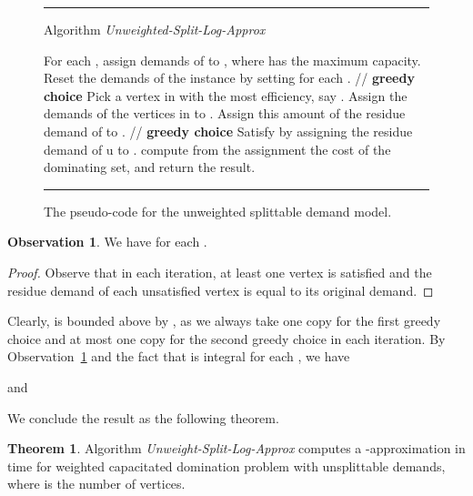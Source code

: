 \documentclass[a4paper,11pt]{article}
\theoremstyle{definition}
\newtheorem{observation}{Observation}
\newtheorem{theorem}{Theorem}
\begin{document}
\begin{figure*}[t]
\rule{\linewidth}{0.2mm}
\medskip
{{\sc Algorithm} {\em Unweighted-Split-Log-Approx}}

\begin{algorithmic}[1]
\STATE For each , assign  demands of  to , where  has the maximum capacity.
\STATE Reset the demands of the instance by setting  for each .
    \STATE // {\bf  greedy choice}
    \STATE Pick a vertex in  with the most efficiency, say .
        \STATE Assign the demands of the vertices in  to .
        \IF{}
            \STATE Assign this amount  of the residue demand of  to .
        \ENDIF
    \STATE
    \STATE // {\bf  greedy choice}
        \STATE Satisfy  by assigning the residue demand of u to .
    \ENDIF
\ENDWHILE
\STATE compute from the assignment the cost of the dominating set, and return the result.

\end{algorithmic}
\rule{\linewidth}{0.2mm} \caption{The pseudo-code for the 
unweighted splittable demand model.} \label{Algorithm for Unweighted Splittable Demand}
\end{figure*}

\begin{observation} \label{observation_unweighted_splittable_n_decrese}
We have  for each .
\end{observation}

\begin{proof}
Observe that in each iteration, at least one vertex is satisfied and the residue demand of each unsatisfied vertex is equal to its original demand.
\end{proof}

Clearly,  is bounded above by , as we always take one copy for the first greedy choice and at most one copy for the second greedy choice in each iteration.
By Observation~\ref{observation_unweighted_splittable_n_decrese} and the fact that  is integral for each , we have 

and 

We conclude the result as the following theorem.

\begin{theorem}
Algorithm {\em Unweight-Split-Log-Approx} computes
a -approximation in  time for weighted capacitated domination
problem with unsplittable demands, where  is the number of
vertices.
\end{theorem}
\end{document}
